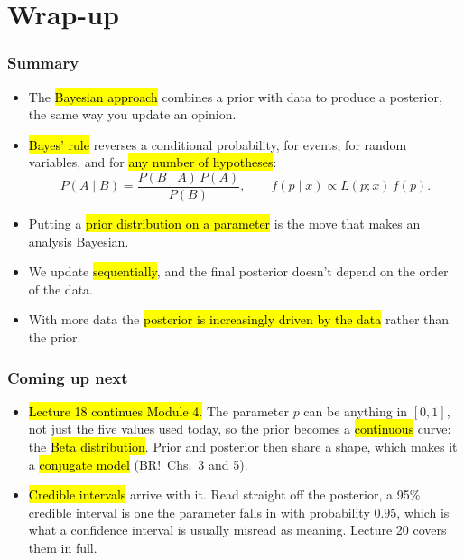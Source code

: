 \documentclass[slidestop,compress,mathserif]{beamer}
\begin{document}
\section{Wrap-up}

\begin{frame}
\frametitle{Summary}

\begin{itemize}
\item The \hl{Bayesian approach} combines a prior with data to produce a posterior, the same way you update an opinion.
\pause
\item \hl{Bayes' rule} reverses a conditional probability, for events, for random variables, and for \hl{any number of hypotheses}:
\vspace{-0.3em}
\[
P(A \mid B) = \frac{P(B \mid A)\,P(A)}{P(B)}, \qquad f(p \mid x) \propto L(p ; x)\, f(p).
\]
\pause
\vspace{-0.5em}
\item Putting a \hl{prior distribution on a parameter} is the move that makes an analysis Bayesian.
\pause
\item We update \hl{sequentially}, and the final posterior doesn't depend on the order of the data.
\pause
\item With more data the \hl{posterior is increasingly driven by the data} rather than the prior.
\end{itemize}

\end{frame}

\begin{frame}
\frametitle{Coming up next}

\begin{itemize}
\item \hl{Lecture 18 continues Module 4.} The parameter $p$ can be anything in $[0,1]$, not just the five values used today, so the prior becomes a \hl{continuous} curve: the \hl{Beta distribution}. Prior and posterior then share a shape, which makes it a \hl{conjugate model} (BR!\ Chs.\ 3 and 5).
\item \hl{Credible intervals} arrive with it. Read straight off the posterior, a 95\% credible interval is one the parameter falls in with probability $0.95$, which is what a confidence interval is usually misread as meaning. Lecture 20 covers them in full.
\end{itemize}

\end{frame}
\end{document}
